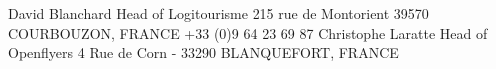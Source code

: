 \cventry
{David Blanchard}
{Head of Logitourisme}
{}
{}
{}
{	215 rue de Montorient 39570 COURBOUZON, FRANCE
	\newline \Telefon  +33 (0)9 64 23 69 87
	\newline \Letter {}}
\cventry
{Christophe Laratte}
{Head of Openflyers}
{}
{}
{}
{	4 Rue de Corn - 33290 BLANQUEFORT, FRANCE
	\newline \Letter {}
}